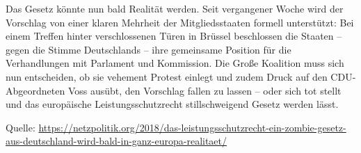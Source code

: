 \documentclass[9pt, a4paper]{scrartcl}
\begin{document}
\begin{zeilenNrZweispaltig}
Das Gesetz könnte nun bald Realität werden. Seit vergangener Woche wird der Vorschlag von einer klaren Mehrheit der Mitgliedsstaaten formell unterstützt: Bei einem Treffen hinter verschlossenen Türen in Brüssel beschlossen die Staaten – gegen die Stimme Deutschlands – ihre gemeinsame Position für die Verhandlungen mit Parlament und Kommission. Die Große Koalition muss sich nun entscheiden, ob sie vehement Protest einlegt und zudem Druck auf den CDU-Abgeordneten Voss ausübt, den Vorschlag fallen zu lassen – oder sich tot stellt und das europäische Leistungsschutzrecht stillschweigend Gesetz werden lässt.
\end{zeilenNrZweispaltig}

{\small Quelle: \url{https://netzpolitik.org/2018/das-leistungsschutzrecht-ein-zombie-gesetz-aus-deutschland-wird-bald-in-ganz-europa-realitaet/}}
\end{document}
